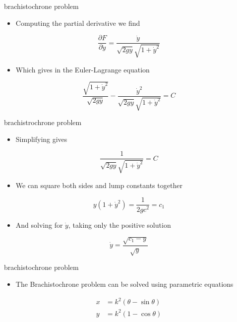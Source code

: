\documentclass[12pt,handout]{beamer}
\providecommand{\tightlist}{%
  \setlength{\itemsep}{0pt}\setlength{\parskip}{0pt}}
\providecommand{\tightlist}{%
\setlength{\itemsep}{0pt}\setlength{\parskip}{0pt}}
\begin{document}
\begin{frame}{brachistochrone problem}
\protect\hypertarget{brachistochrone-problem-1}{}
\begin{itemize}
\tightlist
\item
  Computing the partial derivative we find
\end{itemize}

\[\frac{\partial F}{\partial \dot{y}} = \frac{\dot{y}}{\sqrt{2 g y}\sqrt{1 + \dot{y}^2}}\]

\begin{itemize}
\tightlist
\item
  Which gives in the Euler-Lagrange equation
\end{itemize}

\[\frac{\sqrt{1 + \dot{y}^2}}{\sqrt{2 g y}} - \frac{\dot{y}^2}{\sqrt{2 g y}\sqrt{1 + \dot{y}^2}} = C\]
\end{frame}

\begin{frame}{brachistrochrone problem}
\protect\hypertarget{brachistrochrone-problem}{}
\begin{itemize}
\tightlist
\item
  Simplifying gives
\end{itemize}

\[\frac{1}{\sqrt{2 g y}\sqrt{1 + \dot{y}^2}} = C\]

\begin{itemize}
\tightlist
\item
  We can square both sides and lump constants together
\end{itemize}

\[y(1+\dot{y}^2) = \frac{1}{2gc^2} = c_1\]

\begin{itemize}
\tightlist
\item
  And solving for \(\dot{y}\), taking only the positive solution
\end{itemize}

\[\dot{y} = \frac{\sqrt{c_1-y}}{\sqrt{y}}\]
\end{frame}

\begin{frame}{brachistochrone problem}
\protect\hypertarget{brachistochrone-problem-2}{}
\begin{itemize}
\tightlist
\item
  The Brachistochrone problem can be solved using parametric equations
\end{itemize}

\[\begin{aligned}
  x &= k^2 (\theta - \sin\theta)\\
  y &= k^2 (1-\cos\theta)
\end{aligned}\]
\end{frame}
\end{document}
